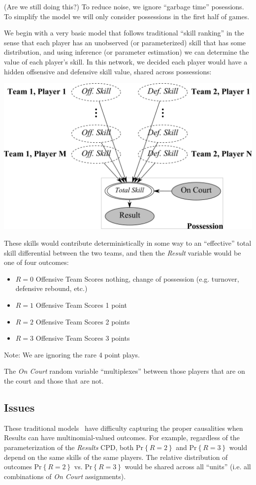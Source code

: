 \documentclass[10pt,twocolumn]{article}
\newcommand{\prb}[1]{\ensuremath{  \mathrm{Pr}\left\{ #1 \right\}  }}
\begin{document}
(Are we still doing this?) To reduce noise, we ignore ``garbage time'' posessions. To simplify the model we will only consider possessions in the first half of games.

We begin with a very basic model that follows traditional ``skill ranking'' in the sense that each player has an unobserved (or parameterized) skill that has some distribution, and using inference (or parameter estimation) we can determine the value of each player's skill.
In this network, we decided each player would have a hidden offsensive and defensive skill value, shared across possessions:
\begin{center}
	\includegraphics[width=0.90\linewidth]{figures/network}
\end{center}
These skills would contribute deterministically in some way to an ``effective'' total skill differential between the two teams, and then the \emph{Result} variable would be one of four outcomes:
\begin{itemize}
\item $R=0$ Offensive Team Scores nothing, change of possession (e.g. turnover, defensive rebound, etc.)
\item $R=1$ Offensive Team Scores 1 point
\item $R=2$ Offensive Team Scores 2 points
\item $R=3$ Offensive Team Scores 3 points
\end{itemize}

Note: We are ignoring the rare 4 point plays. 

The \emph{On Court} random variable ``multiplexes'' between those players that are on the court and those that are not.

\subsection{Issues}
\label{sec:badnetwork}
These traditional models~\cite{herbrich2007trueskilltm} have difficulty capturing the proper causalities when Results can have multinomial-valued outcomes.
For example, regardless of the parameterization of the \emph{Results} CPD, both $\prb{ R = 2}$ and $\prb{R= 3}$ would depend on the same skills of the same players.
The relative distribution of outcomes $\prb{R = 2}$ vs. $\prb{R = 3}$ would be shared across all ``units'' (i.e. all combinations of \emph{On Court} assignments).
\end{document}
